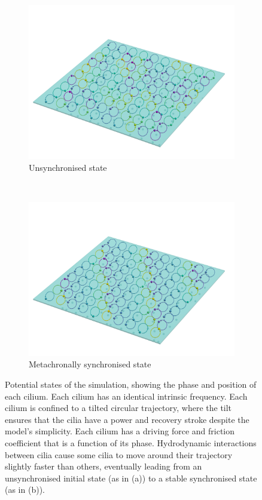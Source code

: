 \begin{figure}
    \begin{subfigure}[t]{0.49\linewidth}
        \centering
        \includegraphics[width=1\textwidth]{images_other/enhanced_2d_unsync.png}
        \caption{Unsynchronised state}
    \end{subfigure}
    ~
    \begin{subfigure}[t]{0.49\linewidth}
        \centering
        \includegraphics[width=1\textwidth]{images_other/enhanced_2d_sync.png}
        \caption{Metachronally synchronised state}
    \end{subfigure}
       
    \caption{Potential states of the simulation, showing the phase and position of each cilium. Each cilium has an identical intrinsic frequency. Each cilium is confined to a tilted circular trajectory, where the tilt ensures that the cilia have a power and recovery stroke despite the model's simplicity. Each cilium has a driving force and friction coefficient that is a function of its phase. Hydrodynamic interactions between cilia cause some cilia to move around their trajectory slightly faster than others, eventually leading from an unsynchronised initial state (as in (a)) to a stable synchronised state (as in (b)).}
    \label{fig:sync_sim}
\end{figure}

